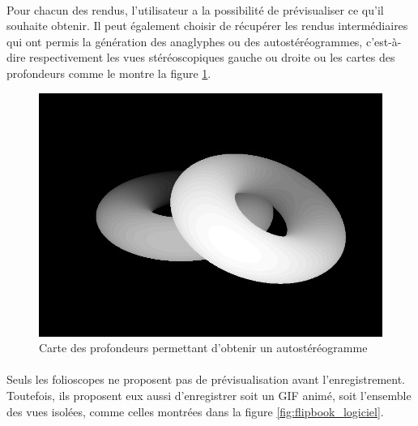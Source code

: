 \paragraph{}
Pour chacun des rendus, l'utilisateur a la possibilité de prévisualiser ce qu'il souhaite obtenir. Il peut également choisir de récupérer les rendus intermédiaires qui ont permis la génération des anaglyphes ou des autostéréogrammes, c'est-à-dire respectivement les vues stéréoscopiques gauche ou droite ou les cartes des profondeurs comme le montre la figure \ref{fig:depthLogiciel}.

\begin{figure}[h]
	\centering
	\includegraphics[scale=0.4]{depth_logiciel.png}
	\caption{\label{fig:depthLogiciel} Carte des profondeurs permettant d'obtenir un autostéréogramme \protect}
\end{figure}

\paragraph{}
Seuls les folioscopes ne proposent pas de prévisualisation avant l'enregistrement. Toutefois, ils proposent eux aussi d'enregistrer soit un GIF animé, soit l'ensemble des vues isolées, comme celles montrées dans la figure \ref{fig:flipbook_logiciel}.

